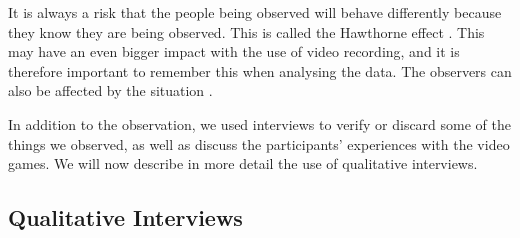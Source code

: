 It is always a risk that the people being observed will behave differently because they know they are being observed. This is called the Hawthorne effect \cite{interview}. This may have an even bigger impact with the use of video recording, and it is therefore important to remember this when analysing the data. The observers can also be affected by the situation \cite{tjora}. 

In addition to the observation, we used interviews to verify or discard some of the things we observed, as well as discuss the participants' experiences with the video games. We will now describe in more detail the use of qualitative interviews.  

\subsection{Qualitative Interviews}
